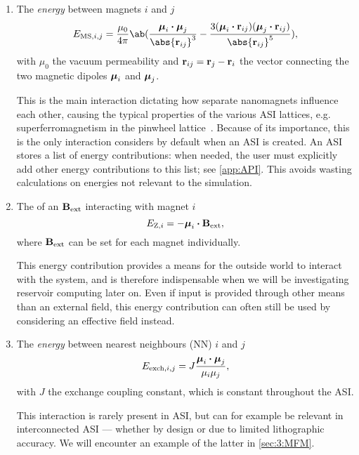\begin{enumerate}
	\item The \emph{ energy} between magnets $i$ and $j$
	\begin{equation}
		\label{eq:2:E_MS}
		E_{\mathrm{MS},i,j} = \frac{\mu_0}{4 \pi} \ab(\frac{\vc{\mu}_i \bcdot \vc{\mu}_j}{\abs{\vc{r}_{ij}}^3} - \frac{3(\vc{\mu}_i \bcdot \vc{r}_{ij}) (\vc{\mu}_j \bcdot \vc{r}_{ij})}{\abs{\vc{r}_{ij}}^5}) \mathrm{,}
	\end{equation}
	with $\mu_0$ the vacuum permeability and $\boldsymbol{\mathbf{r}}_{ij} = \boldsymbol{\mathbf{r}}_j - \boldsymbol{\mathbf{r}}_i$ the vector connecting the two magnetic dipoles $\boldsymbol{\mathbf{\mu}}_i$ and $\boldsymbol{\mathbf{\mu}}_j$. \par
	This is the main interaction dictating how separate nanomagnets influence each other, causing the typical properties of the various ASI lattices, e.g. superferromagnetism in the pinwheel lattice~\cite{li2018pinwheel}.
	Because of its importance, this is the only interaction \hotspice considers by default when an ASI is created.
	An ASI stores a list of energy contributions: when needed, the user must explicitly add other energy contributions to this list; see \cref{app:API}.
	This avoids wasting calculations on energies not relevant to the simulation.
	
	\item The  of an  $\boldsymbol{\mathbf{B}}_\mathrm{ext}$ interacting with magnet $i$
	\begin{equation}
		\label{eq:2:E_Z}
		E_{\mathrm{Z},i} = -\boldsymbol{\mathbf{\mu}}_i \boldsymbol{\cdot} \boldsymbol{\mathbf{B}}_\mathrm{ext} \mathrm{,}
	\end{equation}
	where $\boldsymbol{\mathbf{B}}_\mathrm{ext}$ can be set for each magnet individually. \par
	This energy contribution provides a means for the outside world to interact with the system, and is therefore indispensable when we will be investigating reservoir computing later on.
	Even if input is provided through other means than an external field, this energy contribution can often still be used by considering an effective field instead.
	
	\item The \textit{ energy} between nearest neighbours (NN) $i$ and $j$
	\begin{equation}
		\label{eq:2:E_exch}
		E_{\mathrm{exch},i,j} = J \frac{\boldsymbol{\mathbf{\mu}}_i \boldsymbol{\cdot} \boldsymbol{\mathbf{\mu}}_j}{\mu_i \mu_j} \mathrm{,}
	\end{equation}
	with $J$ the exchange coupling constant, which is constant throughout the ASI. \par
	This interaction is rarely present in ASI, but can for example be relevant in interconnected ASI --- whether by design or due to limited lithographic accuracy.
	We will encounter an example of the latter in \cref{sec:3:MFM}.
\end{enumerate}

